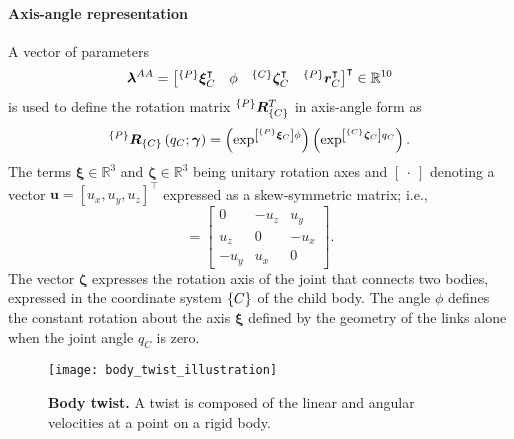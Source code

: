 \paragraph*{Axis-angle representation} A vector of parameters
\begin{equation}\label{eq:kinematic_parameters}
	\bm{\lambda}^{AA} = \begin{bmatrix}
		^{\left\lbrace P \right\rbrace}\bm{\xi}_{C}^\intercal & \phi & ^{\left\lbrace C \right\rbrace}\bm{\zeta}_{C}^\intercal & ^{\left\lbrace P \right\rbrace}\bm{r}^\intercal_C 
	\end{bmatrix}^\intercal \in \mathbb{R}^{10}
\end{equation}
is used to define the rotation matrix $^{\left\lbrace P \right\rbrace}\bm{R}^T_{\left\lbrace C \right\rbrace}$ in axis-angle form \cite{Lynch2017Modernrobotics} as
\begin{equation}\label{eq:rotation_matrix_axis_angle}
	^{\left\lbrace P \right\rbrace}\bm{R}_{\left\lbrace C \right\rbrace}\left(q_{C};\bm{\gamma}\right) = \left(\exp^{\left[{^{\left\lbrace P\right\rbrace}}\bm{\xi}_{C}\right]\phi}\right) \left(\exp^{\left[{^{\left\lbrace C\right\rbrace}}\bm{\zeta}_{C}\right] q_C}	\right).
\end{equation}
The terms $ \bm{\xi} \in \mathbb{R}^3$ and $ \bm{\zeta} \in \mathbb{R}^3$ being unitary rotation axes and  $ \left[~\cdot~\right] $ denoting a vector $\bm{u} = \left[u_x,u_y,u_z\right]^\intercal$ expressed as a skew-symmetric matrix; i.e.,
\begin{equation}
	[\bm{u}] = \begin{bmatrix}
		0                & -u_z             & u_y \\
		u_z              & 0                     & -u_x \\
		-u_y             & u_x              & 0
	\end{bmatrix}.
\end{equation}
The vector $ \bm{\zeta}$ expresses the rotation axis of the joint that connects two bodies, expressed in the coordinate system ${\left\lbrace C \right\rbrace}$ of the child body. The angle $\phi$ defines the constant rotation about the axis $\bm{\xi}$ defined by the geometry of the links alone when the joint angle $q_C$ is zero.
\begin{figure}[t!]
	\begin{center}
		\texttt{[image: body\_twist\_illustration]}
		\caption{\textbf{Body twist.} A twist is composed of the linear and angular velocities at a point on a rigid body.}
		\label{fig:body_twist_illustration}
	\end{center}
\end{figure}


